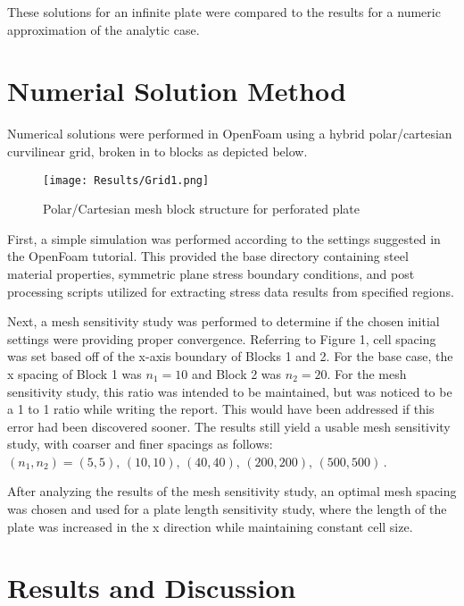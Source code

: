 \documentclass[twocolumn,10pt]{asme2ej}
\begin{document}
These solutions for an infinite plate were compared to the results for a numeric approximation of the analytic case.

\section{Numerial Solution Method}

Numerical solutions were performed in OpenFoam using a hybrid polar/cartesian curvilinear grid, broken in to blocks as depicted below.

\begin{figure}[thb]
\begin{center}
\texttt{[image: Results/Grid1.png]}
\caption{Polar/Cartesian mesh block structure for perforated plate}
\label{blocks}
\end{center}
\end{figure}

First, a simple simulation was performed according to the settings suggested in the OpenFoam tutorial.  This provided the base directory containing steel material properties, symmetric plane stress boundary conditions, and post processing scripts utilized for extracting stress data results from specified regions.

Next, a mesh sensitivity study was performed to determine if the chosen initial settings were providing proper convergence.  Referring to Figure 1, cell spacing was set based off of the x-axis boundary of Blocks 1 and 2.  For the base case, the x spacing of Block 1 was $n_{1}=10$ and Block 2 was $n_{2}=20$.  For the mesh sensitivity study, this ratio was intended to be maintained, but was noticed to be a 1 to 1 ratio while writing the report.  This would have been addressed if this error had been discovered sooner.  The results still yield a usable mesh sensitivity study, with coarser and finer spacings as follows:  $(n_{1},n_{2})=(5,5),\, (10,10),\, (40,40),\, (200,200),\, (500,500)\,$.

After analyzing the results of the mesh sensitivity study, an optimal mesh spacing was chosen and used for a plate length sensitivity study, where the length of the plate was increased in the x direction while maintaining constant cell size.


\section{Results and Discussion}
\end{document}
